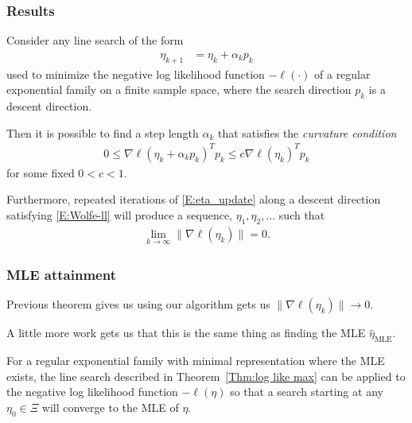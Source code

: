 \documentclass[slidestop,compress, 10pt]{beamer}
\newcommand{\etaMLE}{\hat{\eta}_{\textrm{MLE}}}
\begin{document}
\frame
{
\frametitle{Results}
{\small
\begin{theorem} \label{Thm:log like max}
Consider any line search of the form 
\begin{align}
	\eta_{k+1} &= \eta_k + \alpha_k p_k \label{E:eta_update}
\end{align}
used to minimize the negative log likelihood function $-\ell(\cdot)$ of a regular 
exponential family on a finite sample space, where the search direction $p_k$ 
is a descent direction.

Then it is possible to find a step length $\alpha_k$ 
that satisfies the \emph{curvature condition}
\begin{align}
	0 \leq \nabla \ell( \eta_k + \alpha_k p_k)^T p_k  \leq c \nabla \ell(\eta_k)^T p_k  
\label{E:Wolfe-ll}
\end{align}
for some fixed $0 < c < 1$.

Furthermore, repeated iterations of \eqref{E:eta_update} along a descent direction 
satisfying \eqref{E:Wolfe-ll} will produce a sequence, $\eta_1, \eta_2, \ldots$ such 
that
\begin{align*}
	\lim_{k \to \infty} \lVert \nabla \ell(\eta_k) \rVert = 0.
\end{align*}
\end{theorem}
}
}

\frame
{
\frametitle{MLE attainment}
Previous theorem gives us using our algorithm gets us 
$\lVert \nabla \ell(\eta_k) \rVert \to 0$.  

A little more work gets us that 
this is the same thing as finding the MLE $\etaMLE$.

\begin{theorem} \label{Thm:Line Search works}
For a regular exponential family with minimal representation where the MLE exists, the 
line search described in 
Theorem~\ref{Thm:log like max} can be applied to the negative log likelihood function 
$-\ell(\eta)$ so that a search 
starting at any $\eta_0 \in \Xi$ will converge to the MLE of $\eta$.
\end{theorem}

}
\end{document}
